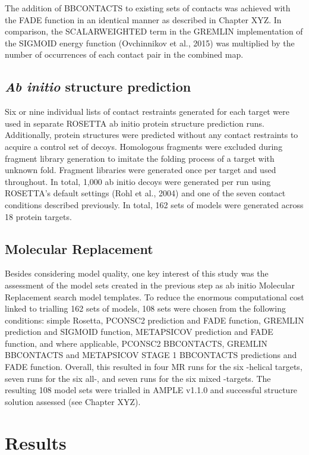 The addition of BBCONTACTS to existing sets of contacts was achieved with the FADE function in an identical manner as described in Chapter XYZ. In comparison, the SCALARWEIGHTED term in the GREMLIN implementation of the SIGMOID energy function (Ovchinnikov et al., 2015) was multiplied by the number of occurrences of each contact pair in the combined map.

\subsection{\textit{Ab initio} structure prediction}
Six or nine individual lists of contact restraints generated for each target were used in separate ROSETTA ab initio protein structure prediction runs. Additionally, protein structures were predicted without any contact restraints to acquire a control set of decoys. Homologous fragments were excluded during fragment library generation to imitate the folding process of a target with unknown fold. Fragment libraries were generated once per target and used throughout. In total, 1,000 ab initio decoys were generated per run using ROSETTA’s default settings (Rohl et al., 2004) and one of the seven contact conditions described previously. In total, 162 sets of models were generated across 18 protein targets.

\subsection{Molecular Replacement}
Besides considering model quality, one key interest of this study was the assessment of the model sets created in the previous step as ab initio Molecular Replacement search model templates. To reduce the enormous computational cost linked to trialling 162 sets of models, 108 sets were chosen from the following conditions: simple Rosetta, PCONSC2 prediction and FADE function, GREMLIN prediction and SIGMOID function, METAPSICOV prediction and FADE function, and where applicable, PCONSC2 BBCONTACTS, GREMLIN BBCONTACTS and METAPSICOV STAGE 1 BBCONTACTS predictions and FADE function. Overall, this resulted in four MR runs for the six \textalpha-helical targets, seven runs for the six all-\textbeta, and seven runs for the six mixed \textalpha-\textbeta targets. The resulting 108 model sets were trialled in AMPLE v1.1.0 and successful structure solution assessed (see Chapter XYZ).

\section{Results}
